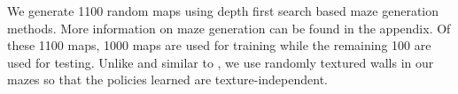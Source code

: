We generate 1100 random maps using depth first search based maze generation methods. More information on maze generation can be found in the appendix. 
Of these 1100 maps, 1000 maps are used for training while the remaining 100 are used for testing.
Unlike \cite{MiPaViICLR2017} and similar to \cite{ChLaSaNIPS2016}, we use randomly textured walls in our mazes so that the policies learned are texture-independent.








%

